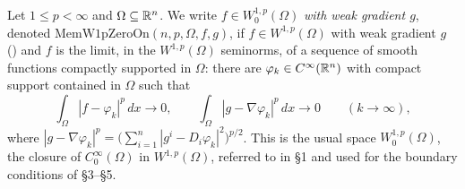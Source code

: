 \begin{definition}
Let $1\le p<\infty$ and $\Omega\subseteq\mathbb{R}^n$. We write $f\in W^{1,p}_0(\Omega)$
\emph{with weak gradient $g$}, denoted $\mathrm{MemW1pZeroOn}(n,p,\Omega,f,g)$,
if $f\in W^{1,p}(\Omega)$ with weak gradient $g$ () and $f$ is
the limit, in the $W^{1,p}(\Omega)$ seminorms, of a sequence of smooth functions
compactly supported in $\Omega$: there are
$\varphi_k\in C^\infty(\mathbb{R}^n)$ with compact support contained in $\Omega$ such
that
\[
\int_\Omega|f-\varphi_k|^p\,dx\longrightarrow 0,
\qquad
\int_\Omega|g-\nabla\varphi_k|^p\,dx\longrightarrow 0
\qquad(k\to\infty),
\]
where $|g-\nabla\varphi_k|^p=\bigl(\sum_{i=1}^n|g^i-D_i\varphi_k|^2\bigr)^{p/2}$.
This is the usual space $W^{1,p}_0(\Omega)$, the closure of $C_0^\infty(\Omega)$
in $W^{1,p}(\Omega)$, referred to in \S1 and used for the boundary conditions of
\S3--\S5.
\end{definition}
